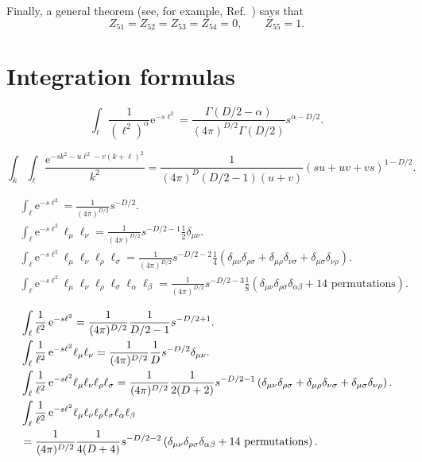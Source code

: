 Finally, a general theorem (see, for example, Ref.~\cite{Collins:1984xc}) says
that
\begin{equation}
   Z_{51}=Z_{52}=Z_{53}=Z_{54}=0,\qquad Z_{55}=1.
\label{eq:(A29)}
\end{equation}

\section{Integration formulas}
\label{sec:B}
\begin{equation}
   \int_\ell\frac{1}{(\ell^2)^\alpha}\mathrm{e}^{-s\ell^2}
   =\frac{\Gamma(D/2-\alpha)}{(4\pi)^{D/2}\Gamma(D/2)}s^{\alpha-D/2}.
\label{eq:(B1)}
\end{equation}

\begin{equation}
   \int_k\int_\ell\frac{\mathrm{e}^{-sk^2-u\ell^2-v(k+\ell)^2}}{k^2}
   =\frac{1}{(4\pi)^D(D/2-1)(u+v)}(su+uv+vs)^{1-D/2}.
\label{eq:(B2)}
\end{equation}

\begin{align}
   &\int_\ell \mathrm{e}^{-s\ell^2}=\frac{1}{(4\pi)^{D/2}}s^{-D/2}.
\label{eq:(B3)}\\
   &\int_\ell \mathrm{e}^{-s\ell^2}\ell_\mu\ell_\nu
   =\frac{1}{(4\pi)^{D/2}}s^{-D/2-1}\frac{1}{2}\delta_{\mu\nu}.
\label{eq:(B4)}\\
   &\int_\ell \mathrm{e}^{-s\ell^2}
   \ell_\mu\ell_\nu\ell_\rho\ell_\sigma
   =\frac{1}{(4\pi)^{D/2}}s^{-D/2-2}
   \frac{1}{4}\left(
   \delta_{\mu\nu}\delta_{\rho\sigma}
   +\delta_{\mu\rho}\delta_{\nu\sigma}
   +\delta_{\mu\sigma}\delta_{\nu\rho}
   \right).
\label{eq:(B5)}\\
   &\int_\ell \mathrm{e}^{-s\ell^2}
   \ell_\mu\ell_\nu\ell_\rho\ell_\sigma\ell_\alpha\ell_\beta
   =\frac{1}{(4\pi)^{D/2}}s^{-D/2-3}\frac{1}{8}
   \left(
   \delta_{\mu\nu}\delta_{\rho\sigma}\delta_{\alpha\beta}
   +\text{$14$ permutations}\right).
\label{eq:(B6)}
\end{align}

\begin{align}
   &\int_\ell\frac{1}{\ell^2}\,
   \mathrm{e}^{-s\ell^2}=\frac{1}{(4\pi)^{D/2}}\frac{1}{D/2-1}s^{-D/2+1}.
\label{eq:(B7)}\\
   &\int_\ell\frac{1}{\ell^2}\,\mathrm{e}^{-s\ell^2}\ell_\mu\ell_\nu
   =\frac{1}{(4\pi)^{D/2}}\frac{1}{D}s^{-D/2}\delta_{\mu\nu}.
\label{eq:(B8)}\\
   &\int_\ell\frac{1}{\ell^2}\,\mathrm{e}^{-s\ell^2}
   \ell_\mu\ell_\nu\ell_\rho\ell_\sigma
   =\frac{1}{(4\pi)^{D/2}}\frac{1}{2(D+2)}s^{-D/2-1}
   \left(
   \delta_{\mu\nu}\delta_{\rho\sigma}
   +\delta_{\mu\rho}\delta_{\nu\sigma}
   +\delta_{\mu\sigma}\delta_{\nu\rho}
   \right).
\label{eq:(B9)}\\
   &\int_\ell\frac{1}{\ell^2}\,\mathrm{e}^{-s\ell^2}
   \ell_\mu\ell_\nu\ell_\rho\ell_\sigma\ell_\alpha\ell_\beta
\notag\\
   &=\frac{1}{(4\pi)^{D/2}}\frac{1}{4(D+4)}s^{-D/2-2}
   \left(
   \delta_{\mu\nu}\delta_{\rho\sigma}\delta_{\alpha\beta}
   +\text{$14$ permutations}\right).
\label{eq:(B10)}
\end{align}

